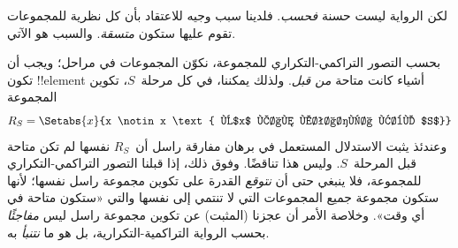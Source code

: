 \documentclass[../../../include/open-logic-section]{subfiles}
\begin{document}
لكن الرواية ليست حسنة \emph{فحسب}. فلدينا سبب وجيه للاعتقاد بأن كل
نظرية للمجموعات تقوم عليها ستكون \emph{متسقة}. والسبب هو الآتي.

بحسب التصور التراكمي-التكراري للمجموعة، نكوّن المجموعات في مراحل؛ ويجب
أن تكون !!{element} أشياء كانت متاحة \emph{من قبل}. ولذلك يمكننا،
في كل مرحلة~$S$، تكوين المجموعة
\[
	R_S = \Setabs{x}{x \notin x \text{ و$x$ كان متاحًا قبل $S$}}
\]
وعندئذ يثبت الاستدلال المستعمل في برهان مفارقة راسل أن~$R_S$ نفسها
لم تكن متاحة قبل المرحلة~$S$. وليس هذا تناقضًا. وفوق ذلك، إذا قبلنا
التصور التراكمي-التكراري للمجموعة، فلا ينبغي حتى أن \emph{نتوقع}
القدرة على تكوين مجموعة راسل نفسها؛ لأنها ستكون مجموعة جميع المجموعات
التي لا تنتمي إلى نفسها والتي «ستكون متاحة في أي وقت». وخلاصة الأمر
أن عجزنا (المثبت) عن تكوين مجموعة راسل ليس \emph{مفاجئًا} بحسب الرواية
التراكمية-التكرارية، بل هو ما \emph{نتنبأ} به.

%

\end{document}
